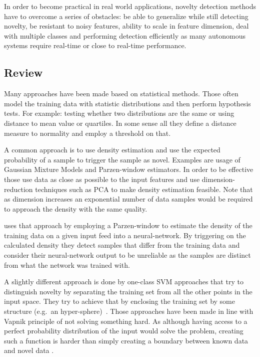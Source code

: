 In order to become practical in real world applications, novelty detection
methods have to overcome a series of obstacles:
be able to generalize while still detecting novelty,
be resistant to noisy features,
ability to scale in feature dimension,
deal with multiple classes and performing detection efficiently as many
autonomous systems require real-time or close to real-time performance.

\subsection{Review}
Many approaches have been made based on statistical methods. Those often model
the training data with statistic distributions and then perform hypothesis tests.
For example: testing whether two distributions are the same or using distance to
mean value or quartiles.
In some sense all they define a distance measure to normality and employ a
threshold on that.

A common approach is to use density estimation and use the expected probability
of a sample to trigger the sample as novel. Examples are usage of
Gaussian Mixture Models and Parzen-window estimators. In order to be effective
those use data as close as possible to the input features and use
dimension-reduction techniques such as \gls{PCA} to make density
estimation feasible. Note that as dimension increases an exponential number
of data samples would be required to approach the density with the same quality.

\cite{bishop1994novelty} uses that approach by employing a Parzen-window to
estimate the density of the training data on a given input feed into a
neural-network. By triggering on the calculated density they detect samples
that differ from the training data and consider their neural-network output
to be unreliable as the samples are distinct from what the network was trained
with.

A slightly different approach is done by one-class \gls{SVM} approaches that
try to distinguish novelty by separating the training set from all the other
points in the input space. They try to achieve that by enclosing the training
set by some structure (e.g.\ an hyper-sphere)~\cite{bennett2000support}.
Those approaches have been made in line with Vapnik principle of not solving
something hard. As although having access to a perfect probability distribution
of the input would solve the problem, creating such a function is harder than
simply creating a boundary between known data and novel data
\cite{scholkopf2000support}.

